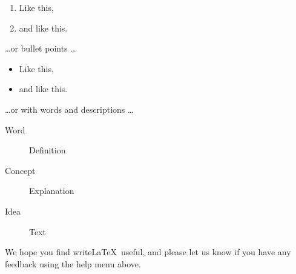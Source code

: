 \begin{enumerate}
\item Like this,
\item and like this.
\end{enumerate}
\dots or bullet points \dots
\begin{itemize}
\item Like this,
\item and like this.
\end{itemize}
\dots or with words and descriptions \dots
\begin{description}
\item[Word] Definition
\item[Concept] Explanation
\item[Idea] Text
\end{description}

We hope you find write\LaTeX\ useful, and please let us know if you have any feedback using the help menu above.








